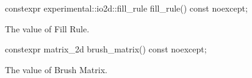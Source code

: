 \begin{itemdecl}
constexpr experimental::io2d::fill_rule fill_rule() const noexcept;
\end{itemdecl}
\begin{itemdescr}
\pnum
\returns
The value of Fill Rule.
\end{itemdescr}

\begin{itemdecl}
constexpr matrix_2d brush_matrix() const noexcept;
\end{itemdecl}
\begin{itemdescr}
\pnum
\returns
The value of Brush Matrix.
\end{itemdescr}
